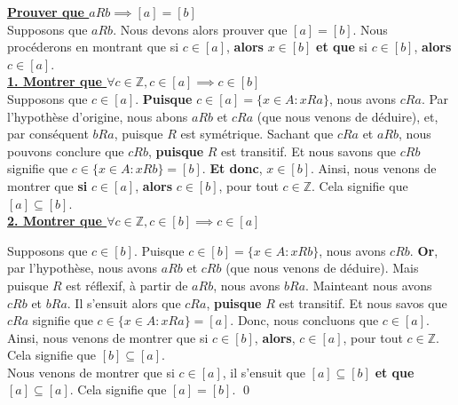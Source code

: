 \documentclass[16pt]{report}
\begin{document}
\begin{multicols*}{2}
\begin{Preuve}{}{}
                \underline{\textbf{Prouver que $aRb \implies [a] = [b]$}}
                \vspace{1em}\\
                \textcolor{myp}{Supposons que $aRb$}. Nous devons alors prouver que $[a] = [b]$. Nous procéderons 
                en montrant que si $c \in [a]$, \textbf{alors} $x \in [b]$ \textbf{et que} si 
                $c \in [b]$, \textbf{alors} $c \in [a]$. 
                \vspace{1em}\\
                \underline{\textbf{1. Montrer que $\forall c \in \mathbb{Z}, c \in [a] \implies  c \in [b]$}}
                \vspace{1em}\\
                Supposons que  $c \in [a]$. \textbf{Puisque} $c \in [a] = \{ x \in A : xRa \}$, nous 
                avons $cRa$. Par l'hypothèse d'origine, nous abons $aRb$ et $cRa$ (que nous venons de déduire), 
                et, par conséquent $bRa$, puisque $R$ est symétrique. Sachant que $cRa$ et $aRb$, nous 
                pouvons conclure que $cRb$, \textbf{puisque} $R$ est transitif. Et nous savons que 
                $cRb$ signifie que $c \in \{x \in A : xRb \} = [b]$. \textbf{Et donc}, $x \in [b]$.   
                Ainsi, nous venons de montrer que \textbf{si} $c \in [a]$, \textbf{alors} $c \in [b]$, pour tout 
                $c \in \mathbb{Z}$. Cela signifie que $[a] \subseteq [b]$. 
                \vspace{1em}
                \\ 

                \underline{\textbf{2. Montrer que $\forall c \in \mathbb{Z}, c \in [b] \implies  c \in [a]$}}

                Supposons que $c \in [b]$. Puisque $c \in [b] = \{ x \in A : xRb \}$, nous avons 
                $cRb$. \textbf{Or}, par \textcolor{myp}{l'hypothèse}, nous avons $aRb$ et $cRb$ (que nous venons 
                de déduire). Mais puisque $R$ est réflexif, à partir de $aRb$, nous avons $bRa$.
                Mainteant nous avons $cRb$ et $bRa$. Il s'ensuit alors que $cRa$, \textbf{puisque} $R$ est 
                transitif. Et nous savos que $cRa$ signifie que $c \in \{x \in A : xRa \} = [a]$. Donc, 
                nous concluons que $c \in [a]$. Ainsi, nous venons de montrer que si 
                $c \in [b]$, \textbf{alors}, $c \in [a]$, pour tout $c \in \mathbb{Z}$. Cela signifie que   
                $[b] \subseteq [a]$. 
                \vspace{1em}
                \\ 
                Nous venons de montrer que si $c \in [a]$, il s'ensuit que $[a] \subseteq [b]$ 
                \textbf{et que} $[a] \subseteq [a]$. Cela signifie que $[a] = [b]$. 
                \qed
            \end{Preuve}



\end{multicols*}
\end{document}
